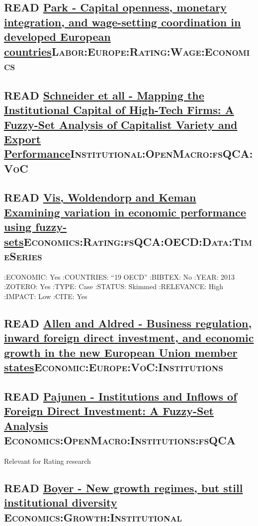 \documentclass[11pt]{article}
\begin{document}
\subsection*{{\bfseries\sffamily READ} \href{https://doi.org/10.1177\%2F0143831X12452944}{Park - Capital openness, monetary integration, and wage-setting coordination in developed European countries}\hfill{}\textsc{Labor:Europe:Rating:Wage:Economics}}
\label{sec:orge59dc90}
\subsection*{{\bfseries\sffamily READ} \href{https://www.jstor.org/stable/27752492}{Schneider et all - Mapping the Institutional Capital of High-Tech Firms: A Fuzzy-Set Analysis of Capitalist Variety and Export Performance}\hfill{}\textsc{Institutional:OpenMacro:fsQCA:VoC}}
\label{sec:orgeee2422}
\subsection*{{\bfseries\sffamily READ} \href{https://doi.org/10.1007/s11135-011-9637-4}{Vis, Woldendorp and Keman Examining variation in economic performance using fuzzy-sets}\hfill{}\textsc{Economics:Rating:fsQCA:OECD:Data:TimeSeries}}
\label{sec:org45f1891}
:ECONOMIC: Yes
:COUNTRIES: ``19 OECD''
:BIBTEX: No
:YEAR:     2013
:ZOTERO:   Yes
:TYPE:     Case
:STATUS:   Skimmed
:RELEVANCE: High
:IMPACT:   Low
:CITE:     Yes
\subsection*{{\bfseries\sffamily READ} \href{https://doi.org/10.1108/17422041311330431}{Allen and Aldred - Business regulation, inward foreign direct investment, and economic growth in the new European Union member states}\hfill{}\textsc{Economic:Europe:VoC:Institutions}}
\label{sec:orgdc6e43a}
\subsection*{{\bfseries\sffamily READ} \href{https://www.jstor.org/stable/25483292}{Pajunen - Institutions and Inflows of Foreign Direct Investment: A Fuzzy-Set Analysis }\hfill{}\textsc{Economics:OpenMacro:Institutions:fsQCA}}
\label{sec:org6d1c135}
Relevant for Rating research

\subsection*{{\bfseries\sffamily READ} \href{https://doi.org/10.1093/soceco/2.1.1}{Boyer - New growth regimes, but still institutional diversity }\hfill{}\textsc{Economics:Growth:Institutional}}
\label{sec:org6d6aef3}
\end{document}
